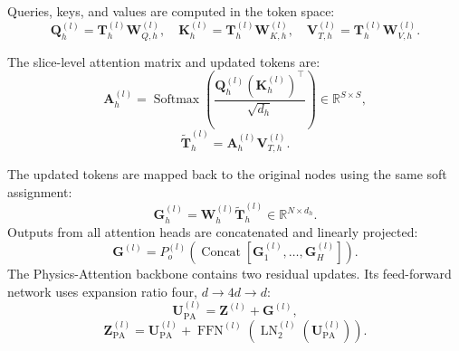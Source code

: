 \documentclass[a4paper,fleqn]{cas-sc}
\begin{document}
Queries, keys, and values are computed in the token space:
\begin{equation}
    \mathbf{Q}_{h}^{(l)}
    =
    \mathbf{T}_{h}^{(l)}
    \mathbf{W}_{Q,h}^{(l)},
    \quad
    \mathbf{K}_{h}^{(l)}
    =
    \mathbf{T}_{h}^{(l)}
    \mathbf{W}_{K,h}^{(l)},
    \quad
    \mathbf{V}_{T,h}^{(l)}
    =
    \mathbf{T}_{h}^{(l)}
    \mathbf{W}_{V,h}^{(l)}.
    \label{eq:token_qkv}
\end{equation}

The slice-level attention matrix and updated tokens are:
\begin{equation}
    \mathbf{A}_{h}^{(l)}
    =
    \operatorname{Softmax}
    \left(
        \frac{
            \mathbf{Q}_{h}^{(l)}
            \left(
                \mathbf{K}_{h}^{(l)}
            \right)^{\top}
        }{
            \sqrt{d_h}
        }
    \right)
    \in\mathbb{R}^{S\times S},
    \label{eq:slice_attention}
\end{equation}
\begin{equation}
    \widetilde{\mathbf{T}}_{h}^{(l)}
    =
    \mathbf{A}_{h}^{(l)}
    \mathbf{V}_{T,h}^{(l)}.
    \label{eq:updated_tokens}
\end{equation}

The updated tokens are mapped back to the original nodes using the same soft assignment:
\begin{equation}
    \mathbf{G}_{h}^{(l)}
    =
    \mathbf{W}_{h}^{(l)}
    \widetilde{\mathbf{T}}_{h}^{(l)}
    \in\mathbb{R}^{N\times d_h}.
    \label{eq:deslicing}
\end{equation}
Outputs from all attention heads are concatenated and linearly projected:
\begin{equation}
    \mathbf{G}^{(l)}
    =
    P_{o}^{(l)}
    \left(
        \operatorname{Concat}
        \left[
            \mathbf{G}_{1}^{(l)},\ldots,
            \mathbf{G}_{H}^{(l)}
        \right]
    \right).
    \label{eq:multihead_output}
\end{equation}
The Physics-Attention backbone contains two residual updates. Its feed-forward network uses expansion ratio four, \(d\rightarrow4d\rightarrow d\):
\begin{equation}
    \mathbf{U}_{\mathrm{PA}}^{(l)}
    =
    \mathbf{Z}^{(l)}
    +
    \mathbf{G}^{(l)},
    \label{eq:attention_residual}
\end{equation}
\begin{equation}
    \mathbf{Z}_{\mathrm{PA}}^{(l)}
    =
    \mathbf{U}_{\mathrm{PA}}^{(l)}
    +
    \operatorname{FFN}^{(l)}
    \left(
        \operatorname{LN}_{2}^{(l)}
        \left(
            \mathbf{U}_{\mathrm{PA}}^{(l)}
        \right)
    \right).
    \label{eq:ffn_residual}
\end{equation}
\end{document}
